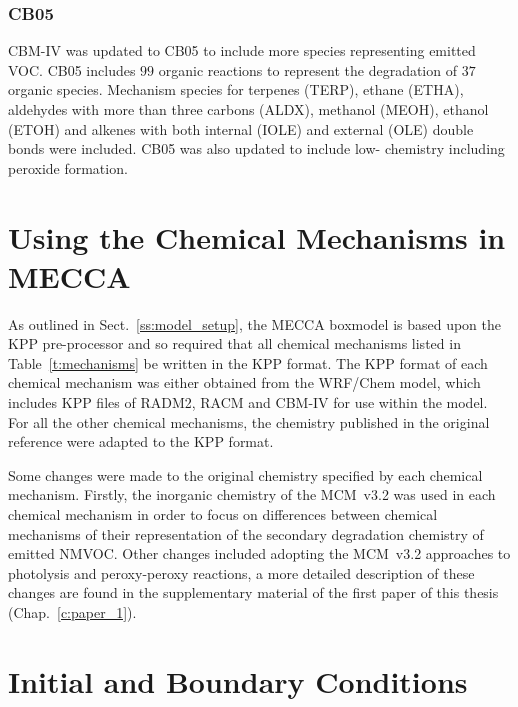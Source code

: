 \subsubsection{CB05}
CBM-IV was updated to CB05 \citep{Yarwood:2005} to include more species representing emitted VOC.
CB05 includes $99$ organic reactions to represent the degradation of $37$ organic species.
Mechanism species for terpenes (TERP), ethane (ETHA), aldehydes with more than three carbons (ALDX), methanol (MEOH), ethanol (ETOH) and alkenes with both internal (IOLE) and external (OLE) double bonds were included.  
CB05 was also updated to include low- chemistry including peroxide formation.

\section{Using the Chemical Mechanisms in MECCA}
As outlined in Sect.~\ref{ss:model_setup}, the MECCA boxmodel is based upon the KPP pre-processor and so required that all chemical mechanisms listed in Table~\ref{t:mechanisms} be written in the KPP format.
The KPP format of each chemical mechanism was either obtained from the WRF/Chem \citep{Grell:2005}  model, which includes KPP files of RADM2, RACM and CBM-IV for use within the model.
For all the other chemical mechanisms, the chemistry published in the original reference were adapted to the KPP format.

Some changes were made to the original chemistry specified by each chemical mechanism.
Firstly, the inorganic chemistry of the MCM~v3.2 was used in each chemical mechanism in order to focus on differences between chemical mechanisms of their representation of the secondary degradation chemistry of emitted NMVOC.
Other changes included adopting the MCM~v3.2 approaches to photolysis and peroxy-peroxy reactions, a more detailed description of these changes are found in the supplementary material of the first paper of this thesis (Chap.~\ref{c:paper_1}). 

\section{Initial and Boundary Conditions}
